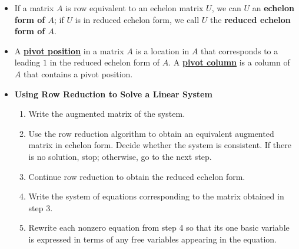 \documentclass{article}
\newtheorem{theorem}{Theorem}
\newcommand{\definition}[1]{\underline{\textbf{#1}}}
\begin{document}
\begin{itemize}

  \item If a matrix $A$ is row equivalent to an echelon matrix $U$, we can $U$ an \textbf{echelon form of $A$}; if $U$ is in reduced echelon form, we call $U$ the \textbf{reduced echelon form of $A$}.

  \item A \definition{pivot position} in a matrix $A$ is a location in $A$ that corresponds to a leading $1$ in the reduced echelon form of $A$. A \definition{pivot column} is a column of $A$ that contains a pivot position.

  \item \textbf{Using Row Reduction to Solve a Linear System}
  \begin{enumerate}
    \item Write the augmented matrix of the system.
    \item Use the row reduction algorithm to obtain an equivalent augmented matrix in echelon form. Decide whether the system is consistent. If there is no solution, stop; otherwise, go to the next step.
    \item Continue row reduction to obtain the reduced echelon form.
    \item Write the system of equations corresponding to the matrix obtained in step 3.
    \item Rewrite each nonzero equation from step 4 so that its one basic variable is expressed in terms of any free variables appearing in the equation.
  \end{enumerate}
  
\end{itemize}

\noindent{}
\end{document}
